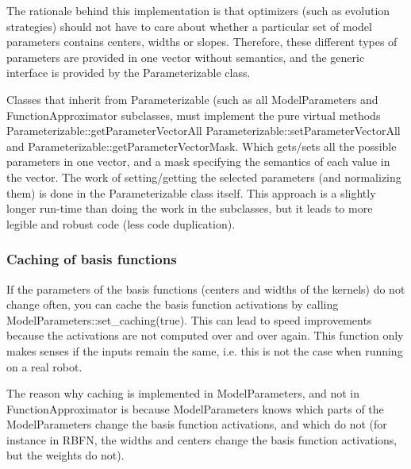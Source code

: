 The rationale behind this implementation is that optimizers (such as evolution strategies) should not have to care about whether a particular set of model parameters contains centers, widths or slopes. Therefore, these different types of parameters are provided in one vector without semantics, and the generic interface is provided by the Parameterizable class.

Classes that inherit from Parameterizable (such as all Model\+Parameters and Function\+Approximator subclasses, must implement the pure virtual methods Parameterizable\+::get\+Parameter\+Vector\+All Parameterizable\+::set\+Parameter\+Vector\+All and Parameterizable\+::get\+Parameter\+Vector\+Mask. Which gets/sets all the possible parameters in one vector, and a mask specifying the semantics of each value in the vector. The work of setting/getting the selected parameters (and normalizing them) is done in the Parameterizable class itself. This approach is a slightly longer run-\/time than doing the work in the subclasses, but it leads to more legible and robust code (less code duplication).\hypertarget{page_func_approx_sec_caching_basisfunctions}{}\subsubsection{Caching of basis functions}\label{page_func_approx_sec_caching_basisfunctions}
If the parameters of the basis functions (centers and widths of the kernels) do not change often, you can cache the basis function activations by calling Model\+Parameters\+::set\+\_\+caching(true). This can lead to speed improvements because the activations are not computed over and over again. This function only makes senses if the inputs remain the same, i.\+e. this is not the case when running on a real robot.

The reason why caching is implemented in Model\+Parameters, and not in Function\+Approximator is because Model\+Parameters knows which parts of the Model\+Parameters change the basis function activations, and which do not (for instance in R\+B\+F\+N, the widths and centers change the basis function activations, but the weights do not). 